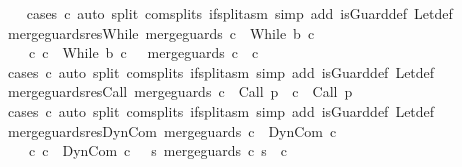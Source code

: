\begin{isabellebody}
%
\isadelimproof
\ \ %
\endisadelimproof
%
\isatagproof
{}\isamarkupfalse%
\ {\isacharparenleft}cases\ c{\isacharparenright}\ {\isacharparenleft}auto\ split{\isacharcolon}\ com{\isachardot}splits\ if{\isacharunderscore}split{\isacharunderscore}asm\ simp\ add{\isacharcolon}\ is{\isacharunderscore}Guard{\isacharunderscore}def\ Let{\isacharunderscore}def{\isacharparenright}%
\endisatagproof
{\isafoldproof}%
%
\isadelimproof
\isanewline
%
\endisadelimproof
\isanewline
{}\isamarkupfalse%
\ merge{\isacharunderscore}guards{\isacharunderscore}res{\isacharunderscore}While{\isacharcolon}\ {\isachardoublequoteopen}merge{\isacharunderscore}guards\ c\ {\isacharequal}\ While\ b\ c{\isacharprime}\ {\isasymLongrightarrow}\ \isanewline
\ \ \ \ {\isasymexists}c{\isacharprime}{\isacharprime}{\isachardot}\ c\ {\isacharequal}\ While\ b\ c{\isacharprime}{\isacharprime}\ \ {\isasymand}\ merge{\isacharunderscore}guards\ c{\isacharprime}{\isacharprime}\ {\isacharequal}\ c{\isacharprime}{\isachardoublequoteclose}\isanewline
%
\isadelimproof
\ \ %
\endisadelimproof
%
\isatagproof
{}\isamarkupfalse%
\ {\isacharparenleft}cases\ c{\isacharparenright}\ {\isacharparenleft}auto\ split{\isacharcolon}\ com{\isachardot}splits\ if{\isacharunderscore}split{\isacharunderscore}asm\ simp\ add{\isacharcolon}\ is{\isacharunderscore}Guard{\isacharunderscore}def\ Let{\isacharunderscore}def{\isacharparenright}%
\endisatagproof
{\isafoldproof}%
%
\isadelimproof
\isanewline
%
\endisadelimproof
\isanewline
{}\isamarkupfalse%
\ merge{\isacharunderscore}guards{\isacharunderscore}res{\isacharunderscore}Call{\isacharcolon}\ {\isachardoublequoteopen}merge{\isacharunderscore}guards\ c\ {\isacharequal}\ Call\ p\ {\isasymLongrightarrow}\ c\ {\isacharequal}\ Call\ p{\isachardoublequoteclose}\isanewline
%
\isadelimproof
\ \ %
\endisadelimproof
%
\isatagproof
{}\isamarkupfalse%
\ {\isacharparenleft}cases\ c{\isacharparenright}\ {\isacharparenleft}auto\ split{\isacharcolon}\ com{\isachardot}splits\ if{\isacharunderscore}split{\isacharunderscore}asm\ simp\ add{\isacharcolon}\ is{\isacharunderscore}Guard{\isacharunderscore}def\ Let{\isacharunderscore}def{\isacharparenright}%
\endisatagproof
{\isafoldproof}%
%
\isadelimproof
\isanewline
%
\endisadelimproof
\isanewline
{}\isamarkupfalse%
\ merge{\isacharunderscore}guards{\isacharunderscore}res{\isacharunderscore}DynCom{\isacharcolon}\ {\isachardoublequoteopen}merge{\isacharunderscore}guards\ c\ {\isacharequal}\ DynCom\ c{\isacharprime}\ {\isasymLongrightarrow}\ \isanewline
\ \ \ \ {\isasymexists}c{\isacharprime}{\isacharprime}{\isachardot}\ c\ {\isacharequal}\ DynCom\ c{\isacharprime}{\isacharprime}\ \ {\isasymand}\ {\isacharparenleft}{\isasymlambda}s{\isachardot}\ {\isacharparenleft}merge{\isacharunderscore}guards\ {\isacharparenleft}c{\isacharprime}{\isacharprime}\ s{\isacharparenright}{\isacharparenright}{\isacharparenright}\ {\isacharequal}\ c{\isacharprime}{\isachardoublequoteclose}\isanewline

\end{isabellebody}
